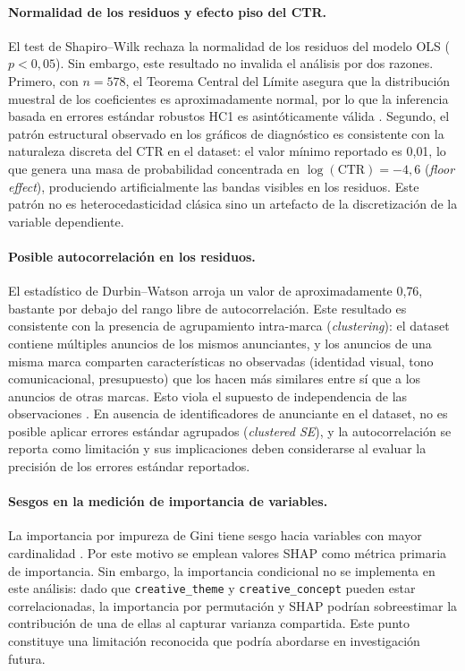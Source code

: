 \documentclass[12pt, a4paper]{report}
\begin{document}
\paragraph{Normalidad de los residuos y efecto piso del CTR.}
El test de Shapiro--Wilk rechaza la normalidad de los residuos del modelo OLS
($p < 0{,}05$). Sin embargo, este resultado no invalida el análisis por dos razones.
Primero, con $n = 578$, el Teorema Central del Límite asegura que la distribución
muestral de los coeficientes es aproximadamente normal, por lo que la inferencia
basada en errores estándar robustos HC1 \citep{white1980} es asintóticamente válida
\citep[Cap.~5]{fox2016}. Segundo, el patrón estructural observado en los gráficos
de diagnóstico es consistente con la naturaleza discreta del CTR en el dataset:
el valor mínimo reportado es 0{,}01, lo que genera una masa de probabilidad
concentrada en $\log(\text{CTR}) = -4{,}6$ (\textit{floor effect}), produciendo
artificialmente las bandas visibles en los residuos. Este patrón no es heterocedasticidad
clásica sino un artefacto de la discretización de la variable dependiente.

\paragraph{Posible autocorrelación en los residuos.}
El estadístico de Durbin--Watson arroja un valor de aproximadamente 0{,}76, bastante
por debajo del rango libre de autocorrelación. Este resultado es consistente con la
presencia de agrupamiento intra-marca (\textit{clustering}): el dataset contiene
múltiples anuncios de los mismos anunciantes, y los anuncios de una misma marca
comparten características no observadas (identidad visual, tono comunicacional,
presupuesto) que los hacen más similares entre sí que a los anuncios de otras marcas.
Esto viola el supuesto de independencia de las observaciones \citep{breiman2001b}.
En ausencia de identificadores de anunciante en el dataset, no es posible aplicar
errores estándar agrupados (\textit{clustered SE}), y la autocorrelación se reporta
como limitación y sus implicaciones deben considerarse al evaluar la precisión de
los errores estándar reportados.

\paragraph{Sesgos en la medición de importancia de variables.}
La importancia por impureza de Gini tiene sesgo hacia variables con mayor cardinalidad
\citep{strobl2007}. Por este motivo se emplean valores SHAP como métrica primaria de
importancia. Sin embargo, la importancia condicional \citep{strobl2008} no se implementa
en este análisis: dado que \texttt{creative\_theme} y \texttt{creative\_concept} pueden
estar correlacionadas, la importancia por permutación y SHAP podrían sobreestimar la
contribución de una de ellas al capturar varianza compartida. Este punto constituye una
limitación reconocida que podría abordarse en investigación futura.
\end{document}
